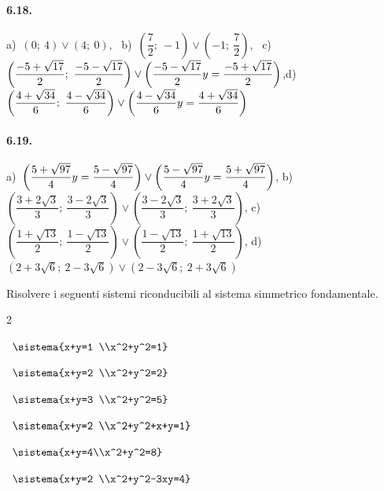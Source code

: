 \paragraph{6.18.} a)~\((0;~4)\vee(4;~0)\),\;~ b)~\(\left(\dfrac 7 
2;~-1\right)\vee\left(-1;~\dfrac 7 2\right)\),\;~ 
c)~\(\left(\dfrac{-5+\sqrt{17}} 
2;~\dfrac{-5-\sqrt{17}} 2\right)\vee \left(\dfrac{-5-\sqrt{17}} 
2\\y=\dfrac{-5+\sqrt{17}} 2\right)\),\quad d)~\(\left(\dfrac{4+\sqrt{34}} 
6;~\dfrac{4-\sqrt{34}} 6\right)\vee \left(\dfrac{4-\sqrt{34}} 
6\\y=\dfrac{4+\sqrt{34}} 6\right)\)

\paragraph{6.19.} a)~\(\left(\dfrac{5+\sqrt{97}} 4\\y=\dfrac{5-\sqrt{97}} 
4\right)\vee \left(\dfrac{5-\sqrt{97}} 4\\y=\dfrac{5+\sqrt{97}} 
4\right)\),\quad 
b)~\(\left(\dfrac{3+{2\sqrt 3}} 3;~\dfrac {3-{2\sqrt 3}} 3\right)\vee 
\left(\dfrac 
{3-{2\sqrt 3}} 3;~\dfrac{3+{2\sqrt 3}} 3\right)\),\quad 
c)~\(\left(\dfrac{1+\sqrt{13}} 2;~\dfrac{1-\sqrt{13}} 2\right)\vee 
\left(\dfrac{1-\sqrt{13}} 2;~\dfrac{1+\sqrt{13}} 2\right)\),\quad 
d)~\(\left(2+3\sqrt 
6;~2-3\sqrt 6\right)\vee \left(2-3\sqrt 6;~2+3\sqrt 6\right)\)

\begin{esercizio}[*]
\label{ese:6.20}
Risolvere i seguenti sistemi riconducibili al sistema simmetrico 
fondamentale.
\begin{htmulticols}{2}
\begin{enumeratea}
\item~\(\sistema{x+y=1 \\x^2+y^2=1}\)
\item~\(\sistema{x+y=2 \\x^2+y^2=2}\)
\item~\(\sistema{x+y=3 \\x^2+y^2=5}\)
\item~\(\sistema{x+y=2 \\x^2+y^2+x+y=1}\)
\item~\(\sistema{x+y=4\\x^2+y^2=8}\)
\item~\(\sistema{x+y=2 \\x^2+y^2-3xy=4}\)
\end{enumeratea}
\end{htmulticols}
\end{esercizio}

